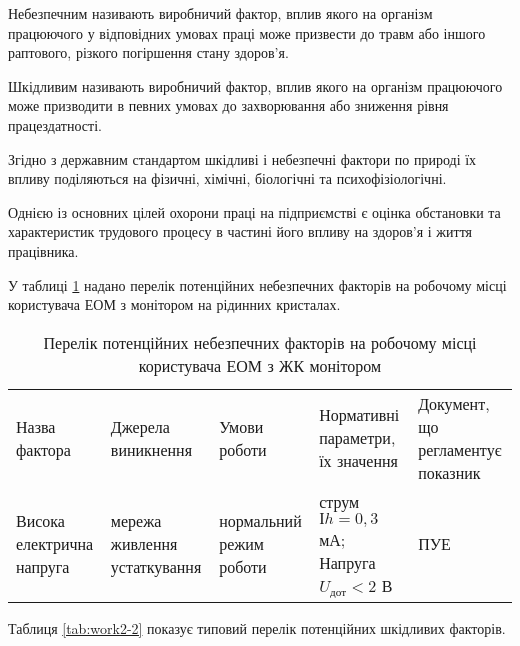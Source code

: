 Небезпечним називають виробничий фактор, вплив якого на організм працюючого у відповідних умовах праці може призвести до травм або іншого раптового, різкого погіршення стану здоров’я.

Шкідливим називають виробничий фактор, вплив якого на організм працюючого може призводити в певних умовах до захворювання або зниження рівня працездатності.

Згідно з державним стандартом шкідливі і небезпечні фактори по природі їх впливу поділяються на фізичні, хімічні, біологічні та психофізіологічні.

Однією із основних цілей охорони праці на підприємстві є оцінка обстановки та характеристик трудового процесу в частині його впливу на здоров’я і життя працівника.

У таблиці \ref{tab:work2-1} надано перелік потенційних небезпечних факторів на робочому місці користувача ЕОМ з монітором на рідинних кристалах.

\begin{table}[hbt]
	\captionstyle{ \raggedright}
	\caption{Перелік потенційних небезпечних факторів на робочому місці користувача ЕОМ з ЖК монітором}\label{tab:work2-1}
	\begin{tabular}{|m{}|m{}|m{}|m{}|m{}|}
		\hline
		Назва фактора& Джерела виникнення& Умови роботи& Нормативні параметри, їх значення & Документ, що регламентує показник \\
		\hlinewd{2pt}
		Висока електрична напруга & мережа живлення устаткування & нормальний режим роботи & струм $Іh = 0,3$ мА; Напруга $U_\text{дот} < 2$ В & ПУЕ \\
		\hline
	\end{tabular}
\end{table}

Таблиця \ref{tab:work2-2} показує типовий перелік потенційних шкідливих факторів.

\newpage

